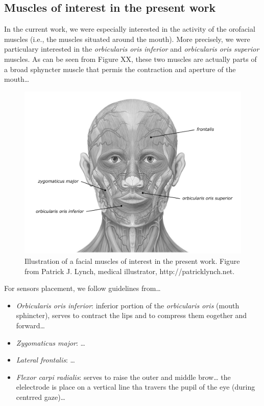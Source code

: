 \documentclass[a4paper,12pt,twoside,openright,oldfontcommands]{memoir}
\begin{document}
\subsection{Muscles of interest in the present
work}\label{muscles-of-interest-in-the-present-work}

In the current work, we were especially interested in the activity of
the orofacial muscles (i.e., the muscles situated around the mouth).
More precisely, we were particulary interested in the \emph{orbicularis
oris inferior} and \emph{orbicularis oris superior} muscles. As can be
seen from Figure XX, these two muscles are actually parts of a broad
sphyncter muscle that permis the contraction and aperture of the
mouth\ldots{}

\begin{figure}[H]

{\centering \includegraphics[width=0.5\linewidth]{assets/facial_muscles} 

}

\caption{Illustration of a facial muscles of interest in the present work. Figure from Patrick J. Lynch, medical illustrator, http://patricklynch.net.}\label{fig:facial}
\end{figure}

For sensors placement, we follow guidelines from\ldots{}

\begin{itemize}
\item
  \emph{Orbicularis oris inferior}: inferior portion of the
  \emph{orbicularis oris} (mouth sphincter), serves to contract the lips
  and to compress them eogether and forward\ldots{}
\item
  \emph{Zygomaticus major}: \ldots{}
\item
  \emph{Lateral frontalis}: \ldots{}
\item
  \emph{Flexor carpi radialis}: serves to raise the outer and middle
  brow\ldots{} the elelectrode is place on a vertical line tha travers
  the pupil of the eye (during centrred gaze)\ldots{}
\end{itemize}
\end{document}
